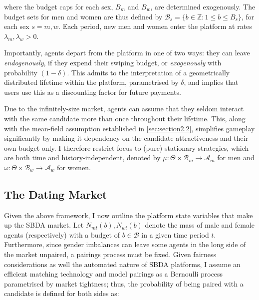 where the budget caps for each sex, $B_m$ and $B_w$, are determined exogenously. The budget sets for men and women are thus defined by $\mathcal{B}_{s}=\{b \in \mathbb{Z} : 1\leq b \leq B_s\}$, for each sex $s=m,w$. Each period, new men and women enter the platform at rates $\lambda_m, \lambda_w>0$.
\begin{comment}
    , with their attractiveness drawn i.i.d from distributions with cumulative distribution functions $F_m$ and $F_w$, respectively
\end{comment}
Importantly, agents depart from the platform in one of two ways: they can leave \textit{endogenously}, if they expend their swiping budget, or \textit{exogenously} with probability $(1-\delta)$. This admits to the interpretation of a geometrically distributed lifetime within the platform, parametrised by $\delta$, and implies that users use this as a discounting factor for future payments.

Due to the infinitely-size market, agents can assume that they seldom interact with the same candidate more than once throughout their lifetime. This, along with the mean-field assumption established in \autoref{sec:section2.2}, simplifies gameplay significantly by making it dependency on the candidate attractiveness and their own budget only. I therefore restrict focus to (pure) stationary strategies, which are both time and history-independent, denoted by $\mu: \Theta \times\mathcal{B}_m\rightarrow \mathcal{A}_m$ for men and $\omega:\Theta \times\mathcal{B}_w\rightarrow \mathcal{A}_w$ for women.

\subsection{The Dating Market}\label{sec:section2.2}
Given the above framework, I now outline the platform state variables that make up the SBDA market. Let $N_{mt}(b), N_{wt}(b)$ denote the mass of male and female agents (respectively) with a budget of $b\in\mathcal{B}$ in a given time period $t$. Furthermore, since gender imbalances can leave some agents in the long side of the market unpaired, a pairings process must be fixed. Given fairness considerations as well the automated nature of SBDA platforms, I assume an efficient matching technology and model pairings as a Bernoulli process parametrised by market tightness; thus, the probability of being paired with a candidate is defined for both sides as:


